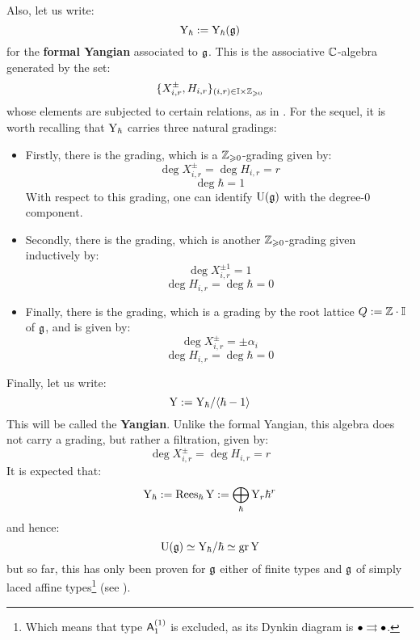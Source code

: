         Also, let us write:
            $$\mathrm{Y}_{\hbar} := \mathrm{Y}_{\hbar}(\mathfrak{g})$$
        for the \textbf{formal Yangian} associated to $\mathfrak{g}$. This is the associative $\mathbb{C}$-algebra generated by the set:
            $$\{ X_{i, r}^{\pm}, H_{i, r} \}_{(i, r) \in \simpleroots \x \Z_{\geq 0}}$$
        whose elements are subjected to certain relations, as in \cite[Definition 2.1]{guay_nakajima_wendlandt_affine_yangian_coproduct}. For the sequel, it is worth recalling that $\mathrm{Y}_{\hbar}$ carries three natural gradings:
        \begin{itemize}
            \item Firstly, there is the  grading, which is a $\mathbb{Z}_{\geqslant 0}$-grading given by:
                $$\deg X_{i, r}^{\pm} = \deg H_{i, r} = r$$
                $$\deg \hbar = 1$$
            With respect to this grading, one can identify $\mathrm{U}(\mathfrak{g})$ with the degree-$0$ component.
            \item Secondly, there is the  grading, which is another $\mathbb{Z}_{\geqslant 0}$-grading given inductively by:
                $$\deg X_{i, r}^{\pm 1} = 1$$
                $$\deg H_{i, r} = \deg \hbar = 0$$
            \item Finally, there is the  grading, which is a grading by the root lattice $Q := \mathbb{Z} \cdot \mathbb{I}$ of $\mathfrak{g}$, and is given by:
                $$\deg X_{i, r}^{\pm} = \pm\alpha_i$$
                $$\deg H_{i, r} = \deg \hbar = 0$$
        \end{itemize}

        Finally, let us write:
            $$\mathrm{Y} := \mathrm{Y}_{\hbar}/\langle\hbar - 1\rangle$$
        This will be called the \textbf{Yangian}. Unlike the formal Yangian, this algebra does not carry a  grading, but rather a  filtration, given by:
            $$\deg X_{i, r}^{\pm} = \deg H_{i, r} = r$$
        It is expected that:
            $$\mathrm{Y}_{\hbar} := \operatorname{Rees}_{\hbar} \mathrm{Y} := \bigoplus_{\hbar} \mathrm{Y}_r \hbar^r$$
        and hence:
            $$\mathrm{U}(\mathfrak{g}) \simeq \mathrm{Y}_{\hbar}/\hbar \simeq \operatorname{gr} \mathrm{Y}$$
        but so far, this has only been proven for $\mathfrak{g}$ either of finite types and $\mathfrak{g}$ of simply laced affine types\footnote{Which means that type $\mathsf{A}_1^{(1)}$ is excluded, as its Dynkin diagram is $\bullet \rightrightarrows \bullet$.} (see \cite{guay_regelskis_wendlandt_affine_yangian_vertex_representations_and_PBW}).